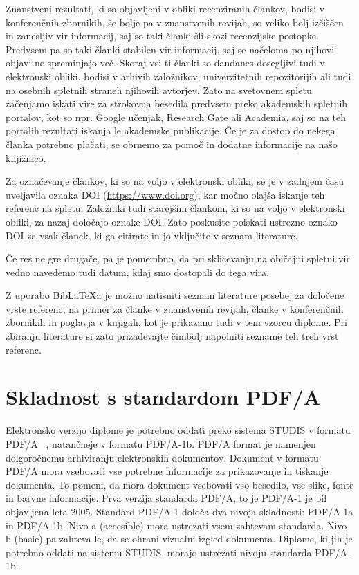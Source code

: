 \documentclass[a4paper,12pt,openright]{book}
\newcommand{\BibLaTeX}{{\sc Bib}\LaTeX}
\begin{document}
    Znanstveni rezultati, ki so objavljeni v obliki recenziranih člankov, bodisi v konferenčnih zbornikih, še bolje pa v znanstvenih revijah, so veliko bolj izčiščen in zanesljiv vir informacij, saj
    so taki članki šli skozi recenzijske postopke. Predvsem pa so taki članki stabilen vir informacij, saj se načeloma po njihovi objavi ne spreminjajo več.
    Skoraj vsi ti članki so dandanes dosegljivi tudi v elektronski obliki, bodisi v arhivih založnikov, univerzitetnih repozitorijih ali tudi na osebnih spletnih straneh njihovih avtorjev.
    Zato na svetovnem spletu začenjamo iskati vire za strokovna besedila predvsem preko akademskih spletnih portalov, kot so npr. Google učenjak, Research Gate ali Academia, saj so na teh portalih rezultati iskanja le akademske publikacije.
    Če je za dostop do nekega članka potrebno plačati, se obrnemo za pomoč in dodatne informacije na našo knjižnico.

    Za označevanje člankov, ki so na voljo v elektronski obliki, se je v zadnjem času uveljavila oznaka DOI
    (\url{https://www.doi.org}), kar močno olajša iskanje teh referenc na spletu.
    Založniki tudi starejšim člankom, ki so na voljo v elektronski obliki, za nazaj določajo oznake DOI.
    Zato poskusite poiskati ustrezno oznako DOI za vsak članek, ki ga citirate in jo vključite v seznam literature.

    Če res ne gre drugače, pa je pomembno, da pri sklicevanju na običajni spletni vir vedno navedemo tudi datum, kdaj smo dostopali do tega vira.

    Z uporabo \BibLaTeX{a} je možno natisniti seznam literature posebej za določene vrste referenc, na primer za članke v znanstvenih revijah, članke v konferenčnih zbornikih in poglavja v knjigah, kot je prikazano tudi v tem vzorcu diplome. Pri zbiranju literature si zato prizadevajte čimbolj napolniti sezname teh treh vrst referenc.


    \chapter{Skladnost s standardom PDF/A}
    \label{PDF}


    Elektronsko verzijo diplome je potrebno oddati preko sistema STUDIS v formatu PDF/A ~\cite{howtopdfa,pdfa},
    natančneje v formatu PDF/A-1b.
    PDF/A format je namenjen dolgoročnemu arhiviranju elektronskih dokumentov.
    Dokument v formatu PDF/A mora vsebovati vse potrebne informacije za prikazovanje in tiskanje dokumenta. To pomeni, da mora dokument vsebovati vso besedilo, vse slike, fonte in barvne informacije.
    Prva verzija standarda PDF/A, to je PDF/A-1 je bil objavljena leta 2005.
    Standard PDF/A-1 določa dva nivoja skladnosti: PDF/A-1a in PDF/A-1b.
    Nivo a (accesible) mora ustrezati vsem zahtevam standarda.
    Nivo b (basic) pa zahteva le, da se ohrani vizualni izgled dokumenta.
    Diplome, ki jih je potrebno oddati na sistemu STUDIS, morajo ustrezati nivoju standarda
    PDF/A-1b.
\end{document}
